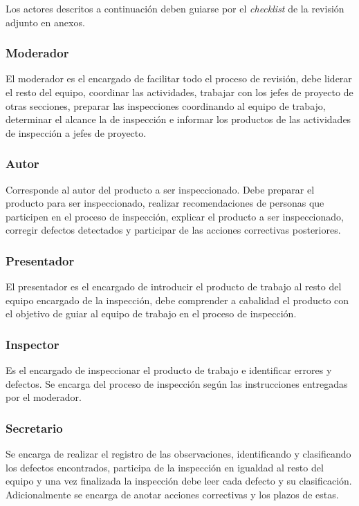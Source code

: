 Los actores descritos a continuación deben guiarse por el \textit{checklist} de la revisión adjunto en anexos. 

\subsubsection{Moderador}

El moderador es el encargado de facilitar todo el proceso de revisión, debe liderar el resto del equipo, coordinar las actividades, trabajar con los jefes de proyecto de otras secciones, preparar las inspecciones coordinando al equipo de trabajo, determinar el alcance la de inspección e informar los productos de las actividades de inspección a jefes de proyecto.

\subsubsection{Autor}

Corresponde al autor del producto a ser inspeccionado. Debe preparar el producto para ser inspeccionado, realizar recomendaciones de personas que participen en el proceso de inspección, explicar el producto a ser inspeccionado, corregir defectos detectados y participar de las acciones correctivas posteriores.

\subsubsection{Presentador}

El presentador es el encargado de introducir el producto de trabajo al resto del equipo encargado de la inspección, debe comprender a cabalidad el producto con el objetivo de guiar al equipo de trabajo en el proceso de inspección. 

\subsubsection{Inspector}

Es el encargado de inspeccionar el producto de trabajo e identificar errores y defectos. Se encarga del proceso de inspección según las instrucciones entregadas por el moderador. 

\subsubsection{Secretario}

Se encarga de realizar el registro de las observaciones, identificando y clasificando los defectos encontrados, participa de la inspección en igualdad al resto del equipo y una vez finalizada la inspección debe leer cada defecto y su clasificación. Adicionalmente se encarga de anotar acciones correctivas y los plazos de estas. 

